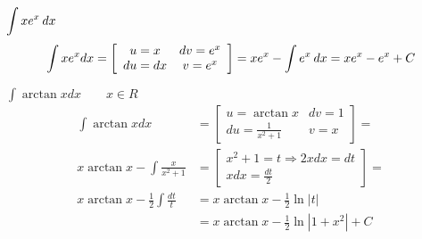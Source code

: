 
  \begin{example}\(\displaystyle\int{xe^x\hspace{2pt}dx}\)
    \begin{equation*}
        \int{xe^xdx}=
          \left[\begin{array}{cc}
            u=x   & dv=e^x \\
            du=dx & v=e^x
          \end{array}\right]=
          xe^x-\int{e^x\hspace{2pt}dx} = xe^x - e^x+C
    \end{equation*}
  \end{example}
  
  \begin{example}$\displaystyle\int{\arctan xdx} \qquad x\in R$
    \begin{align*}
       \int{\arctan xdx}                      &= 
         \left[\begin{array}{cc} 
                  u =\arctan x                     &  dv= 1  \\ 
                 du =\displaystyle\frac{1}{x^2+1}  &   v= x
               \end{array}
         \right]  =                                                                  \\
       x\arctan x-\int\frac{x}{x^2+1}         &= 
         \left[\begin{array}{c} 
                  x^2 + 1 = t  \Rightarrow 2xdx = dt        \\ 
                      xdx = \displaystyle{\frac{dt}{2}}
               \end{array} 
         \right] =                                                                   \\ 
       x\arctan x-\frac{1}{2}\int\frac{dt}{t} &= x\arctan x-\frac{1}{2}\ln|t|        \\
         &=   x\arctan x-\frac{1}{2}\ln|1+x^2|+C                                     \\
    \end{align*}
  \end{example}
  
